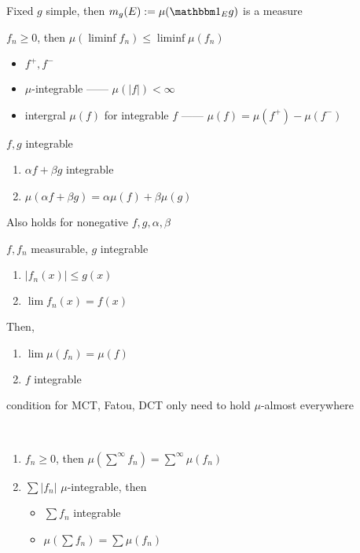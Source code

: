 \begin{lemma}
    Fixed $g$ simple, then $m_g(E) := \mu(\In_E g)$ is a measure
\end{lemma}

\begin{lemma}[Fatou]
    $f_n \geq 0$, then $\mu(\liminf f_n) \leq \liminf \mu(f_n)$
\end{lemma}

\begin{itemize}
    \item $f^+, f^-$
    \item $\mu$-integrable ------ $\mu(|f|) < \infty$
    \item intergral $\mu(f)$ for integrable $f$ ------ $\mu(f) = \mu(f^+) - \mu(f^-)$
\end{itemize}

\begin{prop}
    $f, g$ integrable
    \begin{enumerate}
        \item $\alpha f + \beta g$ integrable
        \item $\mu(\alpha f + \beta g) = \alpha \mu(f) + \beta \mu(g)$
    \end{enumerate}
\end{prop}

\begin{fact}
    Also holds for nonegative $f, g,\alpha, \beta$
\end{fact}

\begin{thm}
    $f, f_n$ measurable, $g$ integrable
    \begin{enumerate}
        \item $|f_n(x)| \leq g(x)$
        \item $\lim f_n(x) = f(x)$
    \end{enumerate}
    Then,
    \begin{enumerate}
        \item $\lim \mu(f_n) = \mu(f)$
        \item $f$ integrable
    \end{enumerate}
\end{thm}

\begin{fact}
    condition for MCT, Fatou, DCT only need to hold $\mu$-almost everywhere
\end{fact}

\begin{cor}\,
    \begin{enumerate}
        \item $f_n \geq 0$, then $\mu\left(\sum^\infty f_n\right) = \sum^\infty \mu(f_n)$
        \item $\sum |f_n|$ $\mu$-integrable, then
        \begin{itemize}
            \item $\sum f_n$ integrable
            \item $\mu \left(\sum f_n\right) = \sum \mu(f_n)$
        \end{itemize}
    \end{enumerate}
\end{cor}

